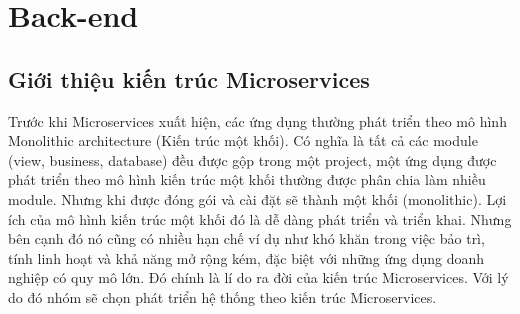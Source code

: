 \section{Back-end}
        \subsection{Giới thiệu kiến trúc Microservices}
        Trước khi Microservices xuất hiện, các ứng dụng thường phát triển theo mô hình Monolithic architecture (Kiến trúc một khối). Có nghĩa là tất cả các module (view, business, database) đều được gộp trong một project, một ứng dụng được phát triển theo mô hình kiến trúc một khối thường được phân chia làm nhiều module. Nhưng khi được đóng gói và cài đặt sẽ thành một khối (monolithic). Lợi ích của mô hình kiến trúc một khối đó là dễ dàng phát triển và triển khai. Nhưng bên cạnh đó nó cũng có nhiều hạn chế ví dụ như khó khăn trong việc bảo trì, tính linh hoạt và khả năng mở rộng kém, đặc biệt với những ứng dụng doanh nghiệp có quy mô lớn. Đó chính là lí do ra đời của kiến trúc Microservices. Với lý do đó nhóm sẽ chọn phát triển hệ thống theo kiến trúc Microservices.
